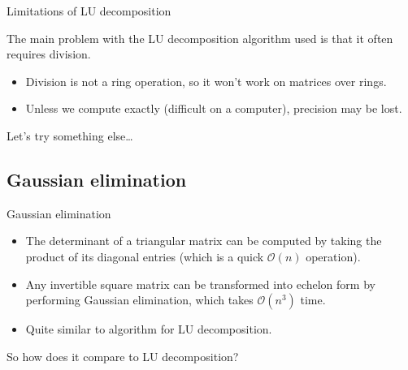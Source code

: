 \documentclass{beamer}
\begin{document}
\begin{frame}{Limitations of LU decomposition}

    The main problem with the LU decomposition algorithm used is that it often requires division.

    \begin{itemize}
        \pause{}
        \item Division is not a ring operation, so it won't work on matrices over rings.
        \pause{}
        \item Unless we compute exactly (difficult on a computer), precision may be lost.
    \end{itemize}

    \pause{}
    Let's try something else\dots

\end{frame}


\subsection{Gaussian elimination}

\begin{frame}{Gaussian elimination}

    \begin{itemize}

        \item The determinant of a triangular matrix can be computed by taking the product of its
            diagonal entries (which is a quick $\mathcal{O}(n)$ operation).

        \item Any invertible square matrix can be transformed into echelon form by performing
            Gaussian elimination, which takes $\mathcal{O}(n^3)$ time.

        \item Quite similar to algorithm for LU decomposition.

    \end{itemize}

    \pause{}

    So how does it compare to LU decomposition?

\end{frame}
\end{document}
